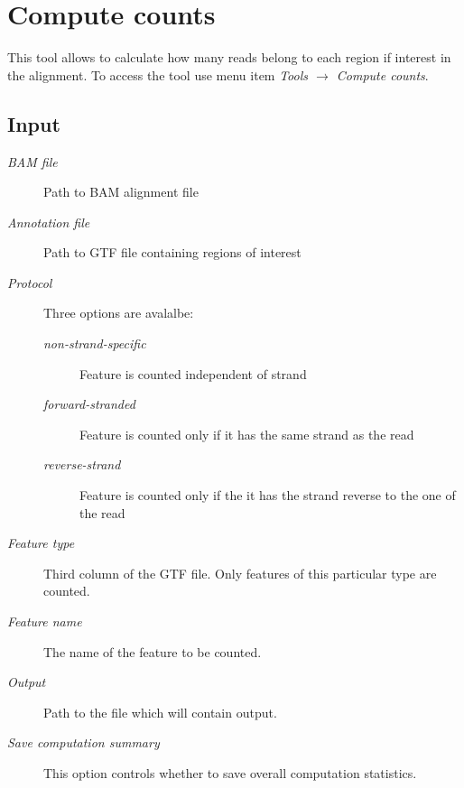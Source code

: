 \documentclass[a4paper,10pt,english]{sphinxmanual}
\begin{document}
\section{Compute counts}
\label{analysis:id8}\label{analysis:compute-counts}
This tool allows to calculate how many reads belong to each region if interest in the alignment. To access the tool use menu item \emph{Tools \(\rightarrow\) Compute counts}.


\subsection{Input}
\label{analysis:id9}\begin{description}
\item[{\emph{BAM file}}] \leavevmode
Path to BAM alignment file

\item[{\emph{Annotation file}}] \leavevmode
Path to GTF file containing regions of interest

\item[{\emph{Protocol}}] \leavevmode
Three options are avalalbe:
\begin{description}
\item[{\emph{non-strand-specific}}] \leavevmode
Feature is counted independent of strand

\item[{\emph{forward-stranded}}] \leavevmode
Feature is counted only if it has the same strand as the read

\item[{\emph{reverse-strand}}] \leavevmode
Feature is counted only if the it has the strand reverse to the one of the read

\end{description}

\item[{\emph{Feature type}}] \leavevmode
Third column of the GTF file. Only features of this particular type are counted.

\item[{\emph{Feature name}}] \leavevmode
The name of the feature to be counted.

\item[{\emph{Output}}] \leavevmode
Path to the file which will contain output.

\item[{\emph{Save computation summary}}] \leavevmode
This option controls whether to save overall computation statistics.

\end{description}
\end{document}
